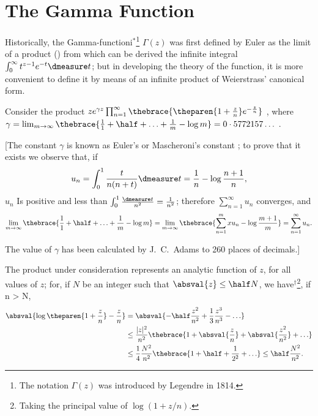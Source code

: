 %
%
\chapter{The Gamma Function}



Historically, the Gamma-functioni$^*$\footnote{The notation
  $\Gamma(z)$ was introduced by Legendre in
  1814.} %
$\Gamma(z)$ was first defined by Euler as the limit of a product
() from which can be derived the infinite
integral $\int_0^\infty t^{z - 1} e^{-t} \dmeasure t$; but in
developing the theory of the function, it is more convenient to define
it by means of an infinite product of Weierstrass' canonical form.

Consider the product 
$ze^{\gamma z} \prod_{n=1}^\infty \thebrace{\theparen{1 + \frac{z}{n}}
  e^{-\frac{z}{n}}}$ , where
$\gamma = \lim_{m \rightarrow \infty} \thebrace{ \frac{1}{1} + \half +
  \ldots + \frac{1}{m} - \log m} = 0 \cdot 5772157 \ldots$ .

[The constant $\gamma$ is known as Euler's or Mascheroni's constant
; to
prove that it exists we observe that, if
\begin{displaymath}
u_n = \int_0^1 \frac{t}{n (n + t)} \dmeasure t = \frac{1}{n} -
\log\frac{n+1}{n} ,
\end{displaymath}
$u_n$ Is positive and less than $\int_0^1 \frac{\dmeasure t}{n^2} = \frac{1}{n^2}$;
therefore $\sum_{n=1}^\infty u_n$ converges, and 
\begin{displaymath}
  \lim_{m \rightarrow \infty} \thebrace{ \frac{1}{1} + \half 
      + \ldots + \frac{1}{m} - \log m} =
  \lim_{m \rightarrow \infty} \thebrace{\sum_{n=1}^mx u_n  - 
      \log \frac{m+1}{m}} =
  \sum_{n=1}^\infty u_n .
\end{displaymath}

The value of $\gamma$ has been calculated by J.~C.~Adams to 260 places of
decimals.]

The product under consideration represents an analytic function of $z$,
for all values of $z$; for, if $N$ be an integer such that $\absval{z} \le
\half  N$, we have$^\dagger$\footnote{Taking the principal value
  of $\log(1 + z/n)$.},%
if n > N,
\begin{align*}
\absval{\log \theparen{1 + \frac{z}{n}} - \frac{z}{n}} 
& =   \absval{ -\half  \frac{z^2}{n^2} + \frac{1}{3} \frac{z^3}{n^3} -
  \ldots} \\
& \le \frac{|z|^2}{n^2} \thebrace{ 1 + \absval{\frac{z}{n}} +
      \absval{\frac{z^2}{n^2}} + \ldots} \\
& \le \frac{1}{4} \frac{N^2}{n^2} \thebrace{ 1 + \half +
      \frac{1}{2^2} + \ldots} \le \half  \frac{N^2}{n^2} .
\end{align*}

